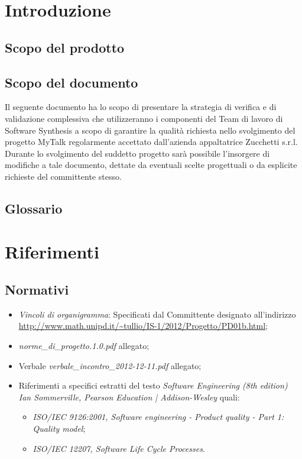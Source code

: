 \section{Introduzione}
\subsection{Scopo del prodotto}
\purpose

\subsection{Scopo del documento}
Il seguente documento ha lo scopo di presentare la strategia di verifica e di validazione complessiva che utilizzeranno i componenti del Team di lavoro di Software Synthesis a scopo di garantire la qualità richiesta nello svolgimento del progetto MyTalk regolarmente accettato dall'azienda appaltatrice Zucchetti s.r.l.\\
Durante lo svolgimento del suddetto progetto sarà possibile l'insorgere di modifiche a tale documento, dettate da eventuali scelte progettuali o da esplicite richieste del committente stesso.
\subsection{Glossario}
\glossaryIntro
\clearpage
\section{Riferimenti}
\subsection{Normativi}
\begin{itemize}
\item[] \textit{Vincoli di organigramma}: Specificati dal Committente designato all'indirizzo\\ \url{http://www.math.unipd.it/~tullio/IS-1/2012/Progetto/PD01b.html};
\item[] \textit{norme\_di\_progetto.1.0.pdf} allegato;
\item[]  Verbale \textit{verbale\_incontro\_2012-12-11.pdf} allegato;
\item[]  Riferimenti a specifici estratti del testo \textit{Software Engineering (8th edition) Ian Sommerville, Pearson Education | Addison-Wesley} quali:
\begin{itemize}
\item[]  \textit{ISO/IEC 9126:2001, Software engineering - Product quality - Part 1: Quality model};
\item[]  \textit{ISO/IEC 12207, Software Life Cycle Processes}.
\end{itemize}
\end{itemize}
